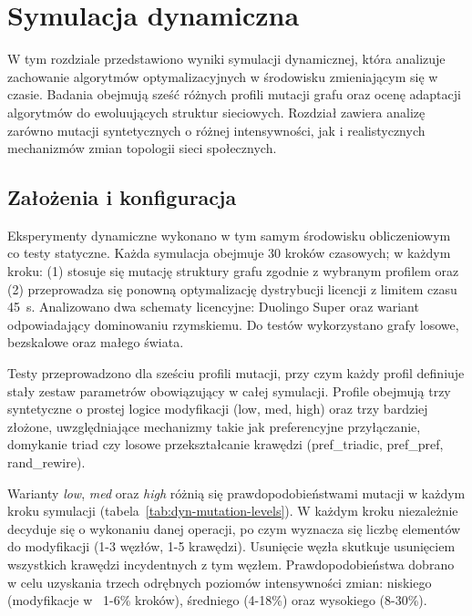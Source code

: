 \chapter{Symulacja dynamiczna}\label{chap:dynamic}

W tym rozdziale przedstawiono wyniki symulacji dynamicznej, która analizuje zachowanie algorytmów optymalizacyjnych w środowisku zmieniającym się w czasie. Badania obejmują sześć różnych profili mutacji grafu oraz ocenę adaptacji algorytmów do ewoluujących struktur sieciowych. Rozdział zawiera analizę zarówno mutacji syntetycznych o różnej intensywności, jak i realistycznych mechanizmów zmian topologii sieci społecznych.

\section{Założenia i konfiguracja}

Eksperymenty dynamiczne wykonano w tym samym środowisku obliczeniowym co testy statyczne. Każda symulacja obejmuje 30 kroków czasowych; w każdym kroku: (1) stosuje się mutację struktury grafu zgodnie z wybranym profilem oraz (2) przeprowadza się ponowną optymalizację dystrybucji licencji z limitem czasu \SI{45}{\second}. Analizowano dwa schematy licencyjne: Duolingo Super oraz wariant odpowiadający dominowaniu rzymskiemu. Do testów wykorzystano grafy losowe, bezskalowe oraz małego świata.

Testy przeprowadzono dla sześciu profili mutacji, przy czym każdy profil definiuje stały zestaw parametrów obowiązujący w całej symulacji. Profile obejmują trzy syntetyczne o prostej logice modyfikacji (low, med, high) oraz trzy bardziej złożone, uwzględniające mechanizmy takie jak preferencyjne przyłączanie, domykanie triad czy losowe przekształcanie krawędzi (pref\_triadic, pref\_pref, rand\_rewire).

Warianty \emph{low}, \emph{med} oraz \emph{high} różnią się prawdopodobieństwami mutacji w każdym kroku symulacji (tabela~\ref{tab:dyn-mutation-levels}). W każdym kroku niezależnie decyduje się o wykonaniu danej operacji, po czym wyznacza się liczbę elementów do modyfikacji (1-3 węzłów, 1-5 krawędzi). Usunięcie węzła skutkuje usunięciem wszystkich krawędzi incydentnych z tym węzłem. Prawdopodobieństwa dobrano w celu uzyskania trzech odrębnych poziomów intensywności zmian: niskiego (modyfikacje w ~1-6\% kroków), średniego (4-18\%) oraz wysokiego (8-30\%).

